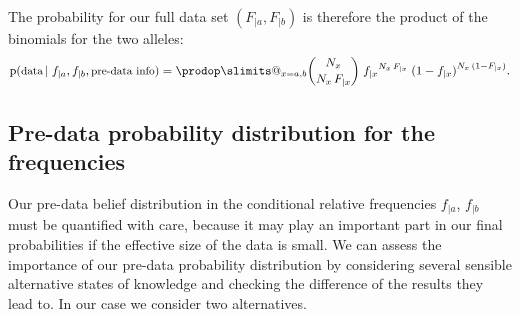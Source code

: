 \documentclass[\ifafour a4paper,12pt,\else a5paper,10pt,\fi%
onecolumn,oneside,article,%
british%
]{memoir}
\makeatletter
\theoremstyle{remark}
\theoremstyle{innote}
\def\prod{\DOTSI\prodop\slimits@}
\newcommand*{\pf}{\mathrm{p}}%
\renewcommand*{\|}[1][]{\nonscript\,#1\vert\nonscript\;\mathopen{}}
\newcommand*{\ptext}[1]{\text{\small #1}}
\newcommand*{\yI}{I}
\newcommand*{\ya}{a}
\newcommand*{\yb}{b}
\makeatother
\begin{document}
The probability for our full data set $(F_{|\ya},F_{|\yb})$ is therefore
the product of the binomials for the two alleles:
\begin{equation}
  \label{eq:sampling_belief_combined}
  \pf(\ptext{data} \|  f_{|\ya},f_{|\yb}, \ptext{pre-data info})
  =
 \prod_{x=\ya,\yb} \binom{N_{x}}{N_{x}\,F_{|x}}\;{f_{|x}}^{N_{x}\,F_{|x}} \;
  {(1-f_{|x})}^{N_{x}\,(1-F_{|x})}.
\end{equation}

\subsection{Pre-data probability distribution for the frequencies}
\label{sec:p_initial}

Our pre-data belief distribution in the conditional relative frequencies
$f_{|\ya}$, $f_{|\yb}$ must be quantified with care, because it may play an
important part in our final probabilities if the effective size of the data
is small. We can assess the importance of our pre-data probability
distribution by considering several sensible alternative states of
knowledge and checking the difference of the results they lead to. In our
case we consider two alternatives.
\end{document}
